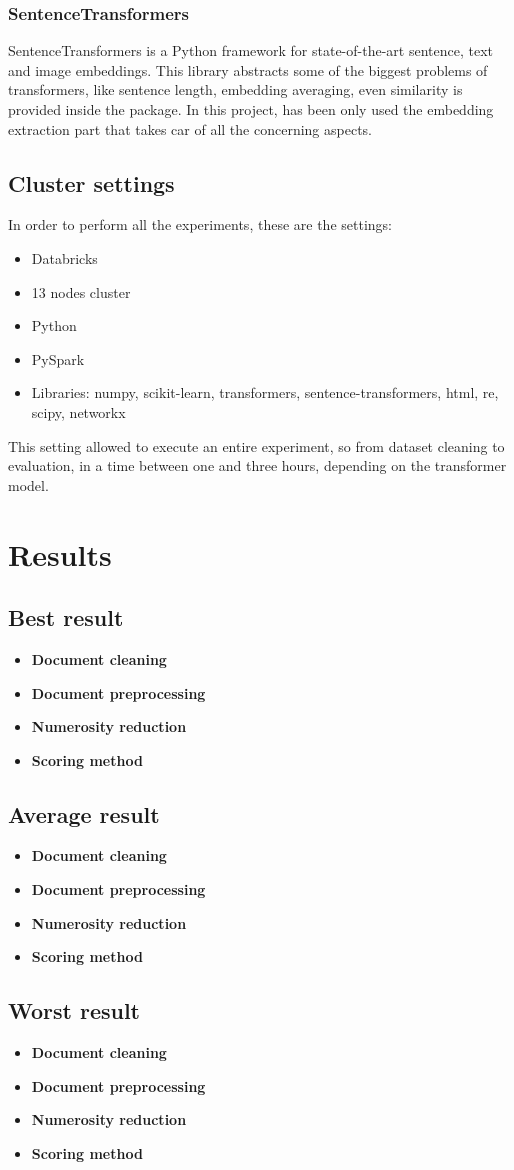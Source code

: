 \documentclass[\main/main.tex]{subfiles}
\begin{document}
\subsubsection{SentenceTransformers}
SentenceTransformers is a Python framework for state-of-the-art sentence, text and image embeddings. This library abstracts some of the biggest problems of transformers, like sentence length, embedding averaging, even similarity is provided inside the package. In this project, has been only used the embedding extraction part that takes car of all the concerning aspects.
\cite{sentence-transformers}
\subsection{Cluster settings}
In order to perform all the experiments, these are the settings:
\begin{itemize}
    \item Databricks
    \item 13 nodes cluster
    \item Python
    \item PySpark
    \item Libraries: numpy, scikit-learn, transformers, sentence-transformers, html, re, scipy, networkx
\end{itemize}
This setting allowed to execute an entire experiment, so from dataset cleaning to evaluation, in a time between one and three hours, depending on the transformer model.
\section{Results}
\subsection{Best result}
\begin{itemize}
    \item \textbf{Document cleaning}
    \item \textbf{Document preprocessing}
    \item \textbf{Numerosity reduction}
    \item \textbf{Scoring method}
\end{itemize}
\subsection{Average result}
\begin{itemize}
    \item \textbf{Document cleaning}
    \item \textbf{Document preprocessing}
    \item \textbf{Numerosity reduction}
    \item \textbf{Scoring method}
\end{itemize}
\subsection{Worst result}
\begin{itemize}
    \item \textbf{Document cleaning}
    \item \textbf{Document preprocessing}
    \item \textbf{Numerosity reduction}
    \item \textbf{Scoring method}
\end{itemize}
\end{document}
